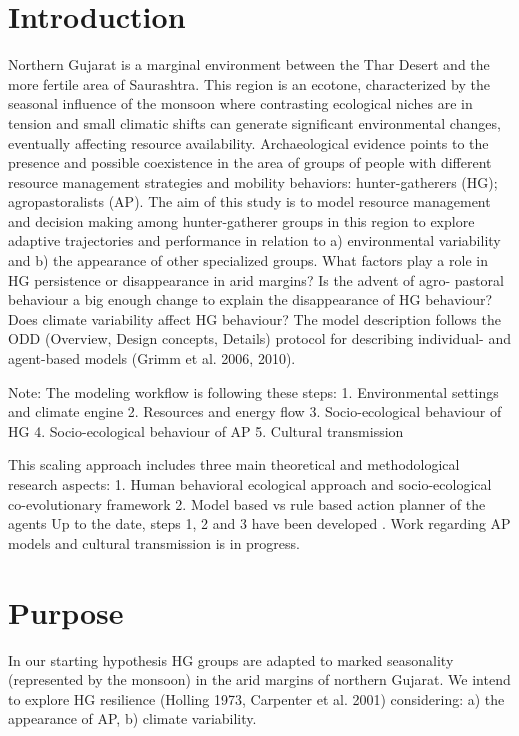 
\section{Introduction}
Northern Gujarat is a marginal environment between the Thar Desert and the more fertile area of
Saurashtra. This region is an ecotone, characterized by the seasonal influence of the monsoon where
contrasting ecological niches are in tension and small climatic shifts can generate significant
environmental changes, eventually affecting resource availability. Archaeological evidence points to
the presence and possible coexistence in the area of groups of people with different resource
management strategies and mobility behaviors: hunter-gatherers (HG); agropastoralists (AP).
The aim of this study is to model resource management and decision making among hunter-gatherer
groups in this region to explore adaptive trajectories and performance in relation to a) environmental
variability and b) the appearance of other specialized groups.
What factors play a role in HG persistence or disappearance in arid margins? Is the advent of agro-
pastoral behaviour a big enough change to explain the disappearance of HG behaviour? Does climate
variability affect HG behaviour?
The model description follows the ODD (Overview, Design concepts, Details) protocol for describing
individual- and agent-based models (Grimm et al. 2006, 2010).

Note:
The modeling workflow is following these steps:
1. Environmental settings and climate engine
2. Resources and energy flow
3. Socio-ecological behaviour of HG
4. Socio-ecological behaviour of AP
5. Cultural transmission

This scaling approach includes three main theoretical and methodological research aspects:
1. Human behavioral ecological approach and socio-ecological co-evolutionary framework
2. Model based vs rule based action planner of the agents
Up to the date, steps 1, 2 and 3 have been developed . Work regarding AP models and cultural
transmission is in progress.


\section{Purpose}
In our starting hypothesis HG groups are adapted to marked seasonality (represented by the
monsoon) in the arid margins of northern Gujarat. We intend to explore HG resilience (Holling 1973,
Carpenter et al. 2001) considering: a) the appearance of AP, b) climate variability.

